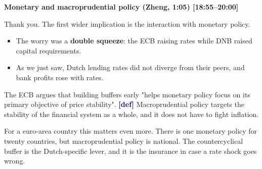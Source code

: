 {\small\textbf{Monetary and macroprudential policy (Zheng, 1:05) [18:55–20:00]}}\par\smallskip
Thank you. The first wider implication is the interaction with monetary policy.
\begin{itemize}\setlength\itemsep{0pt}
\item The worry was a \textbf{double squeeze}: the ECB raising rates while DNB raised capital requirements.
\item As we just saw, Dutch lending rates did not diverge from their peers, and bank profits rose with rates.
\end{itemize}
\par\smallskip
The ECB argues that building buffers early "helps monetary policy focus on its primary objective of price stability". \textcolor{navy}{\textbf{[def]}} Macroprudential policy targets the stability of the financial system as a whole, and it does not have to fight inflation.
\par\smallskip
For a euro-area country this matters even more. There is one monetary policy for twenty countries, but macroprudential policy is national. The countercyclical buffer is the Dutch-specific lever, and it is the insurance in case a rate shock goes wrong.
